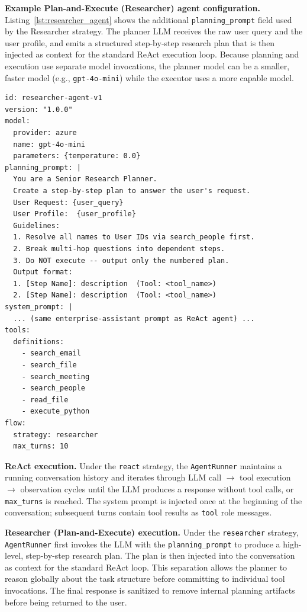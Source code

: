 \documentclass[10pt,twocolumn]{article}
\begin{document}
\textbf{Example Plan-and-Execute (Researcher) agent configuration.}
Listing~\ref{lst:researcher_agent} shows the additional
\texttt{planning\_prompt} field used by the Researcher strategy.
The planner LLM receives the raw user query and the user profile, and
emits a structured step-by-step research plan that is then injected as
context for the standard ReAct execution loop.
Because planning and execution use separate model invocations, the
planner model can be a smaller, faster model (e.g., \texttt{gpt-4o-mini})
while the executor uses a more capable model.

\begin{lstlisting}[caption={Condensed Plan-and-Execute agent configuration (\texttt{researcher\_agent.yaml}).},label={lst:researcher_agent}]
id: researcher-agent-v1
version: "1.0.0"
model:
  provider: azure
  name: gpt-4o-mini
  parameters: {temperature: 0.0}
planning_prompt: |
  You are a Senior Research Planner.
  Create a step-by-step plan to answer the user's request.
  User Request: {user_query}
  User Profile:  {user_profile}
  Guidelines:
  1. Resolve all names to User IDs via search_people first.
  2. Break multi-hop questions into dependent steps.
  3. Do NOT execute -- output only the numbered plan.
  Output format:
  1. [Step Name]: description  (Tool: <tool_name>)
  2. [Step Name]: description  (Tool: <tool_name>)
system_prompt: |
  ... (same enterprise-assistant prompt as ReAct agent) ...
tools:
  definitions:
    - search_email
    - search_file
    - search_meeting
    - search_people
    - read_file
    - execute_python
flow:
  strategy: researcher
  max_turns: 10
\end{lstlisting}

\textbf{ReAct execution.}
Under the \texttt{react} strategy, the \texttt{AgentRunner} maintains a running
conversation history and iterates through LLM call $\to$ tool execution $\to$
observation cycles until the LLM produces a response without tool calls, or
\texttt{max\_turns} is reached.  The system prompt is injected once at the
beginning of the conversation; subsequent turns contain tool results as
\texttt{tool} role messages.

\textbf{Researcher (Plan-and-Execute) execution.}
Under the \texttt{researcher} strategy, \texttt{AgentRunner} first invokes the
LLM with the \texttt{planning\_prompt} to produce a high-level, step-by-step
research plan.  The plan is then injected into the conversation as context for
the standard ReAct loop.  This separation allows the planner to reason globally
about the task structure before committing to individual tool invocations.  The
final response is sanitized to remove internal planning artifacts before being
returned to the user.
\end{document}

